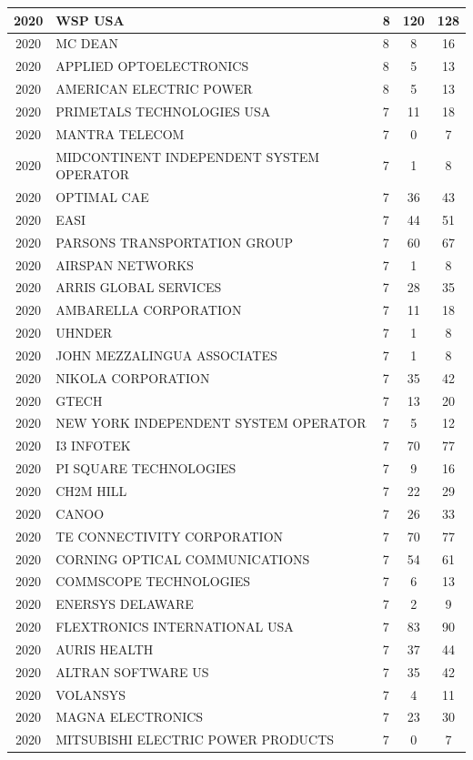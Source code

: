 \documentclass{article}%
\begin{document}
\begin{longtable}{c|p{20em}|p{5em}|c|c}
\hline%
2020&WSP USA&8&120&128\\%
\hline%
2020&MC DEAN&8&8&16\\%
\hline%
2020&APPLIED OPTOELECTRONICS&8&5&13\\%
\hline%
2020&AMERICAN ELECTRIC POWER&8&5&13\\%
\hline%
2020&PRIMETALS TECHNOLOGIES USA&7&11&18\\%
\hline%
2020&MANTRA TELECOM&7&0&7\\%
\hline%
2020&MIDCONTINENT INDEPENDENT SYSTEM OPERATOR&7&1&8\\%
\hline%
2020&OPTIMAL CAE&7&36&43\\%
\hline%
2020&EASI&7&44&51\\%
\hline%
2020&PARSONS TRANSPORTATION GROUP&7&60&67\\%
\hline%
2020&AIRSPAN NETWORKS&7&1&8\\%
\hline%
2020&ARRIS GLOBAL SERVICES&7&28&35\\%
\hline%
2020&AMBARELLA CORPORATION&7&11&18\\%
\hline%
2020&UHNDER&7&1&8\\%
\hline%
2020&JOHN MEZZALINGUA ASSOCIATES&7&1&8\\%
\hline%
2020&NIKOLA CORPORATION&7&35&42\\%
\hline%
2020&GTECH&7&13&20\\%
\hline%
2020&NEW YORK INDEPENDENT SYSTEM OPERATOR&7&5&12\\%
\hline%
2020&I3 INFOTEK&7&70&77\\%
\hline%
2020&PI SQUARE TECHNOLOGIES&7&9&16\\%
\hline%
2020&CH2M HILL&7&22&29\\%
\hline%
2020&CANOO&7&26&33\\%
\hline%
2020&TE CONNECTIVITY CORPORATION&7&70&77\\%
\hline%
2020&CORNING OPTICAL COMMUNICATIONS&7&54&61\\%
\hline%
2020&COMMSCOPE TECHNOLOGIES&7&6&13\\%
\hline%
2020&ENERSYS DELAWARE&7&2&9\\%
\hline%
2020&FLEXTRONICS INTERNATIONAL USA&7&83&90\\%
\hline%
2020&AURIS HEALTH&7&37&44\\%
\hline%
2020&ALTRAN SOFTWARE US&7&35&42\\%
\hline%
2020&VOLANSYS&7&4&11\\%
\hline%
2020&MAGNA ELECTRONICS&7&23&30\\%
\hline%
2020&MITSUBISHI ELECTRIC POWER PRODUCTS&7&0&7\\%

\end{longtable}
\end{document}
